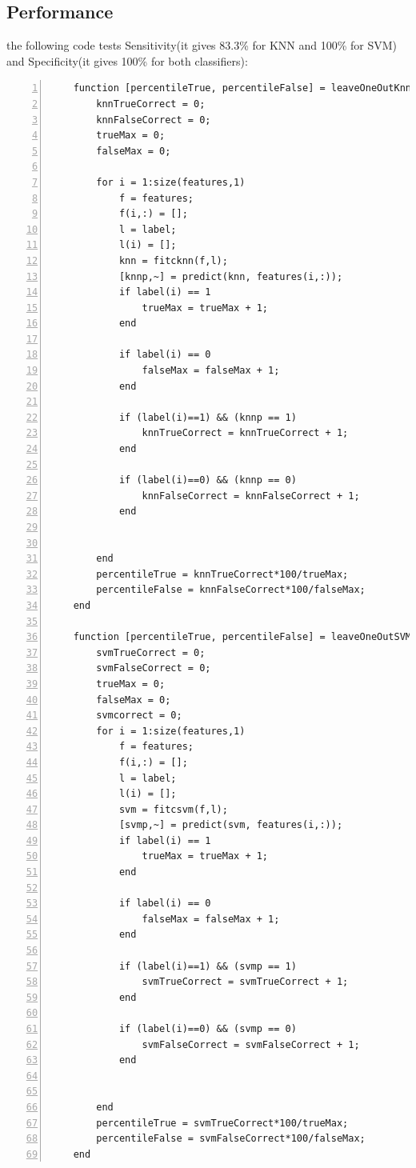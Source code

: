 \documentclass[11pt]{article}
\begin{document}
\subsection{Performance}
the following code tests Sensitivity(it gives 83.3\% for KNN and 100\% for SVM)
and Specificity(it gives 100\% for both classifiers): \\
\begin{lstlisting}[backgroundcolor=\color{lbcolor}, frame=single,
    numbers=left,style=Matlab-editor]
    % leave one out for knn and svm
    function [percentileTrue, percentileFalse] = leaveOneOutKnn(features, label)
        knnTrueCorrect = 0;
        knnFalseCorrect = 0;
        trueMax = 0;
        falseMax = 0;
    
        for i = 1:size(features,1)
            f = features;
            f(i,:) = [];
            l = label;
            l(i) = [];
            knn = fitcknn(f,l);
            [knnp,~] = predict(knn, features(i,:));
            if label(i) == 1
                trueMax = trueMax + 1;
            end
    
            if label(i) == 0
                falseMax = falseMax + 1;
            end
    
            if (label(i)==1) && (knnp == 1)
                knnTrueCorrect = knnTrueCorrect + 1;
            end
    
            if (label(i)==0) && (knnp == 0)
                knnFalseCorrect = knnFalseCorrect + 1;
            end
    
    
        end
        percentileTrue = knnTrueCorrect*100/trueMax;
        percentileFalse = knnFalseCorrect*100/falseMax;
    end
    
    function [percentileTrue, percentileFalse] = leaveOneOutSVM(features, label)
        svmTrueCorrect = 0;
        svmFalseCorrect = 0;
        trueMax = 0;
        falseMax = 0;
        svmcorrect = 0;
        for i = 1:size(features,1)
            f = features;
            f(i,:) = [];
            l = label;
            l(i) = [];
            svm = fitcsvm(f,l);
            [svmp,~] = predict(svm, features(i,:));
            if label(i) == 1
                trueMax = trueMax + 1;
            end
    
            if label(i) == 0
                falseMax = falseMax + 1;
            end
    
            if (label(i)==1) && (svmp == 1)
                svmTrueCorrect = svmTrueCorrect + 1;
            end
    
            if (label(i)==0) && (svmp == 0)
                svmFalseCorrect = svmFalseCorrect + 1;
            end
    
    
        end
        percentileTrue = svmTrueCorrect*100/trueMax;
        percentileFalse = svmFalseCorrect*100/falseMax;
    end   
\end{lstlisting}
\end{document}
